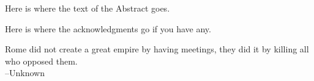 \documentclass[11pt]{psuthesis}
\begin{document}
\begin{singlespace}
\begin{frontmatter}
\signaturepage

\begin{doublespace}
\titlepage
\end{doublespace}

\committeepage

\abstract


Here is where the text of the Abstract goes.







\tables


\acknowledgments  %

Here is where the acknowledgments go if you have any.



\clearpage

\vspace*{2.0truein}

\LARGE
\parbox{4.0truein}{
\par\noindent
Rome did not create a great empire by having meetings, they did it by
killing all who opposed them.\\
\hspace*{\fill}--Unknown
}
\normalsize

\end{frontmatter}


\end{singlespace}
\end{document}
